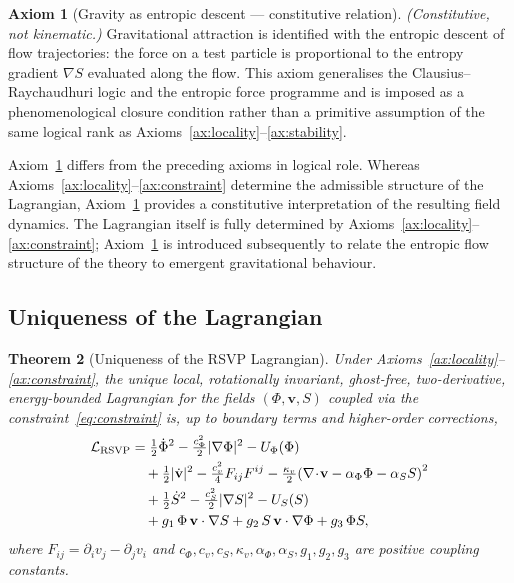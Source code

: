 \documentclass[12pt, a4paper]{article}
\theoremstyle{plain}
\newtheorem{theorem}{Theorem}[section]
\theoremstyle{definition}
\newtheorem{axiom}[theorem]{Axiom}
\theoremstyle{remark}
\newcommand{\vfield}{\mathbf{v}}
\newcommand{\LRSVP}{\mathcal{L}_{\mathrm{RSVP}}}
\newcommand{\divv}{\nabla\!\cdot\!\vfield}
\begin{document}
\begin{axiom}[Gravity as entropic descent --- constitutive relation]
\label{ax:gravity}
\emph{(Constitutive, not kinematic.)} Gravitational attraction is identified with the
entropic descent of flow trajectories: the force on a test particle is proportional
to the entropy gradient $\nabla S$ evaluated along the flow.  This axiom generalises
the Clausius--Raychaudhuri logic \cite{Jacobson1995} and the entropic force
programme \cite{Verlinde2011} and is imposed as a phenomenological closure condition
rather than a primitive assumption of the same logical rank as
Axioms~\ref{ax:locality}--\ref{ax:stability}.
\end{axiom}

Axiom~\ref{ax:gravity} differs from the preceding axioms in logical role. Whereas Axioms~\ref{ax:locality}--\ref{ax:constraint} determine the admissible structure of the Lagrangian, Axiom~\ref{ax:gravity} provides a constitutive interpretation of the resulting field dynamics. The Lagrangian itself is fully determined by Axioms~\ref{ax:locality}--\ref{ax:constraint}; Axiom~\ref{ax:gravity} is introduced subsequently to relate the entropic flow structure of the theory to emergent gravitational behaviour.

\subsection{Uniqueness of the Lagrangian}

\begin{theorem}[Uniqueness of the RSVP Lagrangian]
\label{thm:uniqueness}
Under Axioms~\ref{ax:locality}--\ref{ax:constraint}, the unique local, rotationally
invariant, ghost-free, two-derivative, energy-bounded Lagrangian for the fields
$(\Phi, \vfield, S)$ coupled via the constraint~\eqref{eq:constraint} is, up to
boundary terms and higher-order corrections,
\begin{align}
\LRSVP &= \tfrac{1}{2}\dot{\Phi}^2 - \tfrac{c_\Phi^2}{2}|\nabla\Phi|^2 - U_\Phi(\Phi)
\notag\\
&\quad + \tfrac{1}{2}|\dot{\vfield}|^2 - \tfrac{c_v^2}{4}F_{ij}F^{ij}
       - \tfrac{\kappa_v}{2}\!\left(\divv - \alpha_\Phi\Phi - \alpha_S S\right)^2
\notag\\
&\quad + \tfrac{1}{2}\dot{S}^2 - \tfrac{c_S^2}{2}|\nabla S|^2 - U_S(S)
\notag\\
&\quad + g_1\,\Phi\,\vfield\cdot\nabla S
       + g_2\,S\,\vfield\cdot\nabla\Phi
       + g_3\,\Phi S,
\label{eq:Lagrangian}
\end{align}
where $F_{ij} = \partial_i v_j - \partial_j v_i$ and $c_\Phi, c_v, c_S, \kappa_v, \alpha_\Phi, \alpha_S, g_1, g_2, g_3$ are
positive coupling constants.
\end{theorem}
\end{document}
